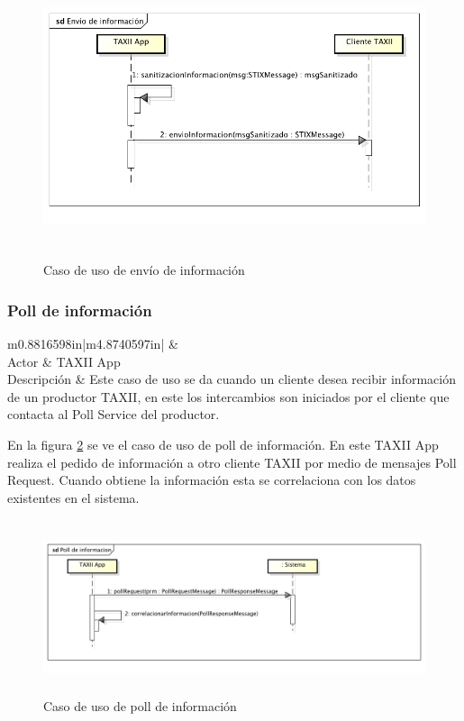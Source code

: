 \begin{figure}[H]
	\centering  \includegraphics[width=5.7638in,height=3.2764in]{Analisis22-img/Analisis22-img029.png}
	\caption{Caso de uso de envío de información}
	\label{fig.enviodeinfo}
\end{figure}

\subsubsection{Poll de información}
\begin{flushleft}
	\tablefirsthead{}
	\tablehead{}
	\tabletail{}
	\tablelasttail{}
	\begin{supertabular}{m{0.8816598in}|m{4.8740597in}|}
		 &
		\\\hline
		{Actor} &
		{TAXII App}\\
		{Descripción} &
		{Este caso de uso se da cuando un cliente desea recibir información de un
			productor TAXII, en este los intercambios son iniciados por el cliente que contacta al Poll Service del
			productor.}\\\hhline{~-}
	\end{supertabular}
\end{flushleft}

\bigskip

En la figura \ref{fig.pollinfo} se ve el caso de uso de poll de información. En este TAXII App realiza el pedido de información a otro
cliente TAXII por medio de mensajes Poll Request. Cuando obtiene la información esta se correlaciona con los datos
existentes en el sistema.

\begin{figure}[H]
	\centering  \includegraphics[width=5.7638in,height=2.0154in]{Analisis22-img/Analisis22-img030.png}
	\caption{Caso de uso de poll de
		información}
	\label{fig.pollinfo}
\end{figure}
	
